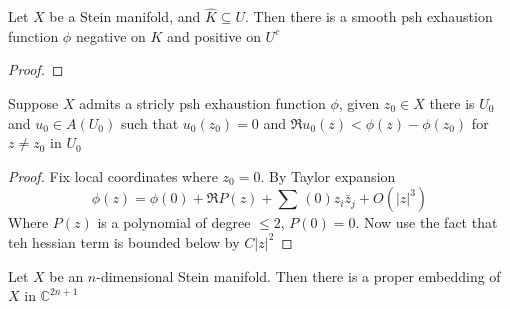 \documentclass[../main.tex]{subfiles}
\begin{document}
\begin{proposition}
Let $X$ be a Stein manifold, and $\hat K\subseteq U$. Then there is a smooth psh exhaustion function $\phi$ negative on $K$ and positive on $U^c$
\end{proposition}

\begin{proof}

\end{proof}

\begin{lemma}
Suppose $X$ admits a stricly psh exhaustion function $\phi$, given $z_0\in X$ there is $U_0$ and $u_0\in A(U_0)$ such that $u_0(z_0)=0$ and $\Re u_0(z)<\phi(z)-\phi(z_0)$ for $z\neq z_0$ in $U_0$
\end{lemma}

\begin{proof}
Fix local coordinates where $z_0=0$. By Taylor expansion
\[\phi(z)=\phi(0)+\Re P(z)+\sum\frac{}{}(0)z_i\bar z_j+O(|z|^3)\]
Where $P(z)$ is a polynomial of degree $\leq2$, $P(0)=0$. Now use the fact that teh hessian term is bounded below by $C|z|^2$
\end{proof}

\begin{theorem}
Let $X$ be an $n$-dimensional Stein manifold. Then there is a proper embedding of $X$ in $\mathbb C^{2n+1}$
\end{theorem}
\end{document}

